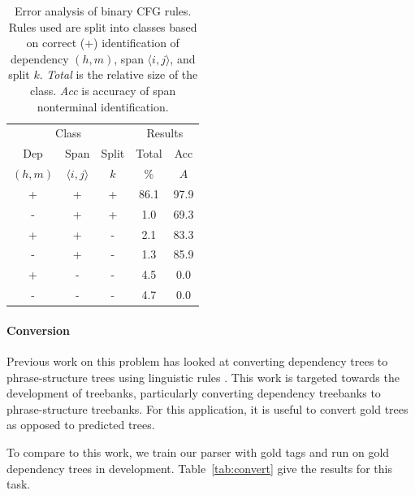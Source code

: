 \documentclass[11pt,letterpaper]{article}
\newcommand{\Span}[1]{\langle #1 \rangle}
\begin{document}
\begin{table}
  \centering
  \footnotesize
  \begin{tabular}{|ccc|cc|}
    \hline 
    \multicolumn{3}{|c|}{Class} & \multicolumn{2}{|c|}{Results} \\
    Dep & Span & Split & Total & Acc  \\ 
    $(h, m)$ & $\Span{i,j}$ & $k$ & \% & $A$ \\ 
    \hline
    + & + & +  &  86.1  & 97.9   \\ 
    - & + & +  &  1.0   & 69.3   \\ 
    + & + & -  &  2.1   & 83.3   \\ 
    - & + & -  &  1.3   & 85.9   \\ 
    + & - & -  &  4.5   & 0.0    \\ 
    - & - & -  &  4.7   & 0.0    \\ 
    \hline
  \end{tabular}
  \label{tab:analysis}
  \caption{Error analysis of binary CFG rules. Rules used are split into classes based on 
    correct (+) identification of dependency $(h,m)$, span $\Span{i,j}$, and split $k$. 
    \textit{Total} is the relative size of the class. \textit{Acc} is accuracy of span nonterminal identification.
  }
\end{table}

\paragraph{Conversion}

Previous work on this problem has looked at converting dependency trees to phrase-structure trees using linguistic rules \cite{xia2001converting,xia2009towards}. This work is targeted towards the development of treebanks, particularly converting dependency treebanks to phrase-structure treebanks.
For this application, it is useful to convert gold trees as opposed to predicted trees.

To compare to this work, we train our parser with gold tags and run on gold dependency trees in development. Table~\ref{tab:convert} give the results for this task.
\end{document}
